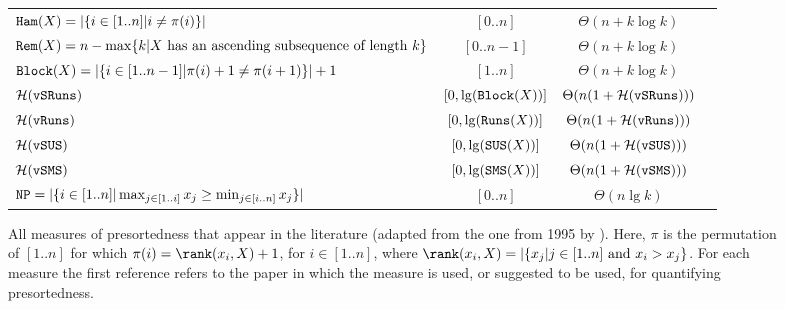 \begin{figure}
\begin{tabular}{l|c|c|c}
$\mathtt{Ham}(X)=|\{i\in[1..n] | i\neq\pi(i)\}|$  & $[0..n]$ &$\Theta(n + k\log k)$&\cite{1989-IC-ANewMeasureOfPresortedness-EstivillCastroWood,1990-PhD-AdaptiveSorting-Petersson} \\
$\mathtt{Rem}(X)=n-\max\{k|X\mbox{ has an ascending subsequence of length $k$}\}$  & $[0..n-1]$ &$\Theta(n + k\log k)$&\cite{} \\
$\mathtt{Block}(X)=|\{i\in[1..n-1] | \pi(i)+1 \neq \pi(i+1)\}|+1$  & $[1..n]$ &$\Theta(n + k\log k)$&\cite{1993-Algoritmica-SulinearMergingAndnaturalMergeSort-CarlssonLevcopoulosPetersson} \\
\hline
${\cal H}(\mathtt{vSRuns})$  & $[0,\lg(\mathtt{Block}(X))]$ & $\Theta(n(1+{\cal H}(\mathtt{vSRuns})))$ & \cite{2009-STACS-CompressedRepresentationsOfPermutationsAndApplications-BarbayNavarro,2013-TCS-CompressedRepresentationsOfPermutationsAndApplications-BarbayNavarro} \\
${\cal H}(\mathtt{vRuns})$  & $[0,\lg(\mathtt{Runs}(X))]$ & $\Theta(n(1+{\cal H}(\mathtt{vRuns})))$ & \cite{2009-STACS-CompressedRepresentationsOfPermutationsAndApplications-BarbayNavarro,2013-TCS-CompressedRepresentationsOfPermutationsAndApplications-BarbayNavarro} \\
${\cal H}(\mathtt{vSUS})$  & $[0,\lg(\mathtt{SUS}(X))]$ & $\Theta(n(1+{\cal H}(\mathtt{vSUS})))$ & \cite{2009-STACS-CompressedRepresentationsOfPermutationsAndApplications-BarbayNavarro,2013-TCS-CompressedRepresentationsOfPermutationsAndApplications-BarbayNavarro} \\
${\cal H}(\mathtt{vSMS})$  & $[0,\lg(\mathtt{SMS}(X))]$ & $\Theta(n(1+{\cal H}(\mathtt{vSMS})))$ &   
\cite{2009-STACS-CompressedRepresentationsOfPermutationsAndApplications-BarbayNavarro,2013-TCS-CompressedRepresentationsOfPermutationsAndApplications-BarbayNavarro} \\
\hline
$\mathtt{NP}= |\{ i\in[1..n] | \max_{j\in[1..i]}x_j \geq \min_{j\in[i..n]}x_j\}|$  & $[0..n]$ & $\Theta(n\lg k)$ & \cite{2016-ARXIV-SynergisticSortingAndDeferredDataStructuresOnMultiSets-BarbayOchoaRao} \\

\end{tabular}
\caption{All measures of presortedness that appear in the literature (adapted from the one from 1995 by \textcite{1995-DAM-AFrameworkForAdaptiveSorting-PeterssonMoffat}). Here, $\pi$ is the permutation of $[1..n]$ for which $\pi(i)=\rank(x_i,X)+1$, for $i\in[1..n]$, where $\rank(x_i,X)=|\{ x_j | j\in[1..n] \mbox{ and } x_i>x_j\}$. For each measure the first reference refers to the paper in which the measure is used, or suggested to be used, for quantifying presortedness.}
\label{fig:DefinitionsOfMeasuresOfDisorder}
\end{figure}

